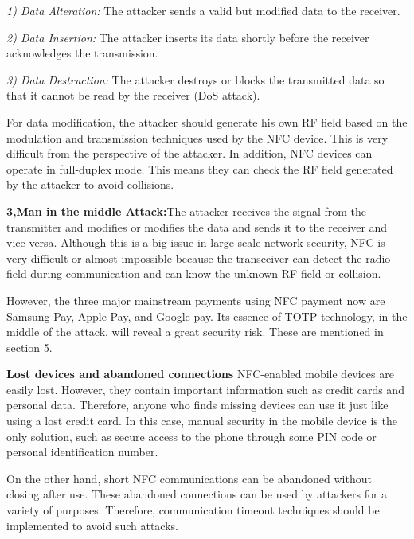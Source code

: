 \documentclass[journal]{IEEEtran}
\begin{document}
\textit{1) Data Alteration:} The attacker sends a valid but modified data to the receiver.

\textit{2) Data Insertion:} The attacker inserts its data shortly before the receiver acknowledges the transmission.

\textit{3) Data Destruction:} The attacker destroys or blocks the transmitted data so that it cannot be read by the receiver (DoS attack).

For data modification, the attacker should generate his own RF field based on the modulation and transmission techniques used by the NFC device. This is very difficult from the perspective of the attacker. In addition, NFC devices can operate in full-duplex mode. This means they can check the RF field generated by the attacker to avoid collisions.

\textbf{3,Man in the middle Attack:}The attacker receives the signal from the transmitter and modifies or modifies the data and sends it to the receiver and vice versa. Although this is a big issue in large-scale network security, NFC is very difficult or almost impossible because the transceiver can detect the radio field during communication and can know the unknown RF field or collision.

However, the three major mainstream payments using NFC payment now are Samsung Pay, Apple Pay, and Google pay. Its essence of TOTP technology, in the middle of the attack, will reveal a great security risk. These are mentioned in section 5.

\textbf{Lost devices and abandoned connections}
NFC-enabled mobile devices are easily lost. However, they contain important information such as credit cards and personal data. Therefore, anyone who finds missing devices can use it just like using a lost credit card. In this case, manual security in the mobile device is the only solution, such as secure access to the phone through some PIN code or personal identification number.

On the other hand, short NFC communications can be abandoned without closing after use. These abandoned connections can be used by attackers for a variety of purposes. Therefore, communication timeout techniques should be implemented to avoid such attacks.
\end{document}
